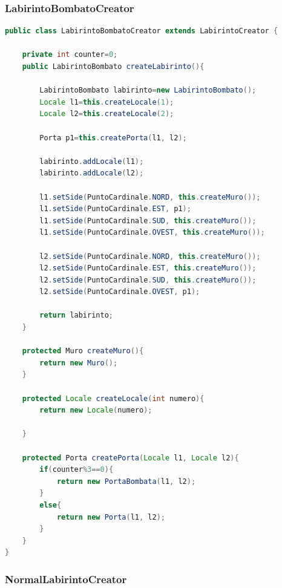 \documentclass{article}
\begin{document}
\subsubsection{LabirintoBombatoCreator}
\begin{lstlisting}[language=Java]
public class LabirintoBombatoCreator extends LabirintoCreator {
	
	private int counter=0;
	public LabirintoBombato createLabirinto(){
		
		LabirintoBombato labirinto=new LabirintoBombato();
		Locale l1=this.createLocale(1);
		Locale l2=this.createLocale(2);
		
		Porta p1=this.createPorta(l1, l2);
		
		labirinto.addLocale(l1);
		labirinto.addLocale(l2);
		
		l1.setSide(PuntoCardinale.NORD, this.createMuro());
		l1.setSide(PuntoCardinale.EST, p1);
		l1.setSide(PuntoCardinale.SUD, this.createMuro());
		l1.setSide(PuntoCardinale.OVEST, this.createMuro());
		
		l2.setSide(PuntoCardinale.NORD, this.createMuro());
		l2.setSide(PuntoCardinale.EST, this.createMuro());
		l2.setSide(PuntoCardinale.SUD, this.createMuro());
		l2.setSide(PuntoCardinale.OVEST, p1);
		
		return labirinto;
	}
	
	protected Muro createMuro(){
		return new Muro();
	}
	
	protected Locale createLocale(int numero){
		return new Locale(numero);
		
	}
	
	protected Porta createPorta(Locale l1, Locale l2){
		if(counter%3==0){
			return new PortaBombata(l1, l2);
		}
		else{
			return new Porta(l1, l2);
		}
	}
}
\end{lstlisting}

\subsubsection{NormalLabirintoCreator}
\end{document}
